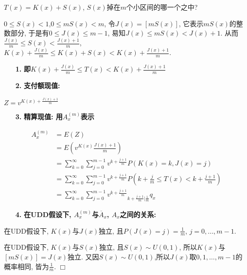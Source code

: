 \documentclass[a4paper,10pt]{ctexbook}
\newcommand{\hei}{\CJKfamily{hei}}      %
\def\qed{\hfill$\Box$\medskip}
\begin{document}
$T(x)=K(x)+S(x)$, $S(x)$掉在$m$个小区间的哪一个之中?

$0 \leq S(x)<1$,$0\leq mS(x)<m$, 令$J(x)=[mS(x)]$, 它表示$mS(x)$的整数部分, 于是有$0\leq J(x)\leq m-1$, 易知$J(x)\leq mS(x)<J(x)+1$. 从而$\frac{J(x)}{m}\leq S(x)<\frac{J(x)+1}{m}$, $K(x)+\frac{J(x)}{m}\leq K(x)+S(x)< K(x)+\frac{J(x)+1}{m}$.

\begin{itemize}
    \item[{\bf\hei 1.}]{\bf\hei 即$K(x)+\frac{J(x)}{m}\leq T(x)< K(x)+\frac{J(x)+1}{m}$}
\end{itemize}

\begin{itemize}
    \item[{\bf\hei 2.}]{\bf\hei 支付额现值: }
\end{itemize}

$Z=v^{K(x)+\frac{J(x)+1}{m}}$

\begin{itemize}
    \item[{\bf\hei 3.}]{\bf\hei 精算现值: 用$A_{x}^{(m)}$表示}
\end{itemize}
\begin{align*}
    A_{x}^{(m)} & =E(Z)                                                                                            \\
                & =E(v^{K(x)}\frac{J(x)+1}{m})                                                                     \\
                & =\sum_{k=0}^{\infty}\sum_{j=0}^{m-1}v^{k+\frac{j+1}{m}}P(K(x)=k,J(x)=j)                          \\
                & =\sum_{k=0}^{\infty}\sum_{j=0}^{m-1}v^{k+\frac{j+1}{m}}P(k+\frac{j}{m}\leq T(x)<k+\frac{j+1}{m}) \\
                & =\sum_{k=0}^{\infty}\sum_{j=0}^{m-1}v^{k+\frac{j+1}{m}}{}_{k+\frac{j+1}{m}|\frac{1}{m}}q_{x}
\end{align*}
\begin{itemize}
    \item[{\bf\hei 4.}]{\bf\hei 在UDD假设下, $A_{x}^{(m)}$与$\overline A_{x}$, $A_{x}$之间的关系:}
\end{itemize}

\begin{proposition}
    在UDD假设下, $K(x)$与$J(x)$独立, 且$P(J(x)=j)=\frac{1}{m}$, $j=0, ..., m-1.$
\end{proposition}

\proof
在UDD假设下, $K(x)$与$S(x)$独立, 且$S(x)\sim U(0,1)$, 所以$K(x)$与$[mS(x)]=J(x)$独立. 又因$S(x)\sim U(0,1)$,所以$J(x)$取$0, 1, \dots, m-1$的概率相同, 皆为$\frac{1}{m}$.
\qed
\end{document}
